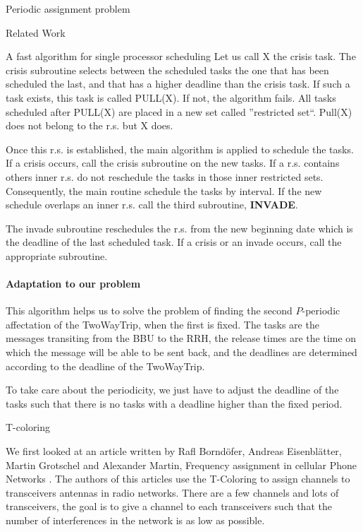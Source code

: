 \documentclass[a4paper,10pt]{report}
\begin{document}
\begin{chapter}{Periodic assignment problem}
\begin{section}{Related Work}
\begin{subsection}{A fast algorithm for single processor scheduling}
Let us call X the crisis task.
The crisis subroutine selects between the scheduled tasks the one that has been scheduled the last, and that has a higher deadline than the crisis task.
If such a task exists, this task is called PULL(X). If not, the algorithm fails.
All tasks scheduled after PULL(X) are placed in a new set called ''restricted set``.
Pull(X) does not belong to the r.s. but X does.

Once this r.s. is established, the main algorithm is applied to schedule the tasks. If a crisis occurs, call the crisis subroutine on the new tasks.
If a r.s. contains others inner r.s. do not reschedule the tasks in those inner restricted sets. Consequently, the main routine schedule 
the tasks by interval. If the new schedule overlaps an inner r.s. call the third subroutine, {\bf INVADE}.

The invade subroutine reschedules the r.s. from the new beginning date which is the deadline of the last scheduled task. If a crisis or an invade occurs,
call the appropriate subroutine.

\paragraph{Adaptation to our problem}
This algorithm helps us to solve the problem of finding the second $P$-periodic affectation of the TwoWayTrip, when the first is fixed. 
The tasks are the messages transiting from the BBU to the RRH, the release times are the time on which the message will be able to be sent back,
and the deadlines are determined according to the deadline of the TwoWayTrip.

To take care about the periodicity, we just have to adjust the deadline of the tasks such that there is no tasks with a deadline 
higher than the fixed period.

\end{subsection}


\begin{subsection}{T-coloring}


 We first looked at an article written by Rafl Borndöfer, Andreas Eisenblätter, Martin Grotschel and Alexander Martin, Frequency assignment
 in cellular Phone Networks \cite{borndorfer1998frequency}. The authors of this articles use the T-Coloring to assign channels to transceivers antennas in radio networks. There are a few channels and lots of transceivers, the goal is to give a channel to each transceivers
 such that the number of interferences in the network is as low as possible.
 

\end{subsection}
\end{section}
\end{chapter}
\end{document}
